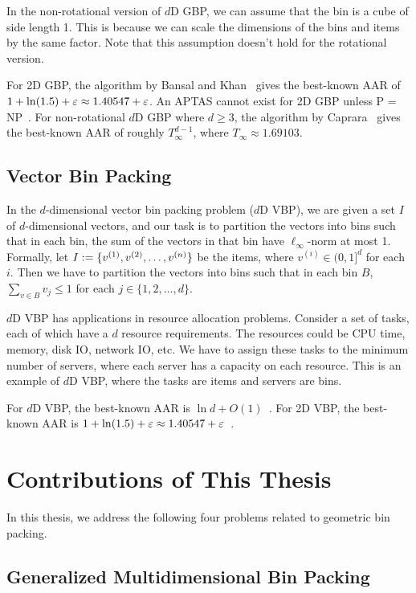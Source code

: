 In the non-rotational version of $d$D GBP, we can assume \wLoG{} that
the bin is a cube of side length 1.
This is because we can scale the dimensions of the bins and items by the same factor.
Note that this assumption doesn't hold for the rotational version.

For 2D GBP, the algorithm by Bansal and Khan~\cite{bansal2014binpacking}
gives the best-known AAR of $1 + \ln(1.5) + \varepsilon \approx 1.40547 + \varepsilon$.
An APTAS cannot exist for 2D GBP unless P = NP~\cite{bansal2006bin,chlebik2009hardness}.
For non-rotational $d$D GBP where $d \ge 3$, the algorithm by Caprara~\cite{caprara2008}
gives the best-known AAR of roughly $T_{\infty}^{d-1}$, where $T_{\infty} \approx 1.69103$.

\subsection{Vector Bin Packing}

In the $d$-dimensional vector bin packing problem ($d$D VBP),
we are given a set $I$ of $d$-dimensional vectors,
and our task is to partition the vectors into bins such that in each bin,
the sum of the vectors in that bin have $\ell_\infty$-norm at most 1.
Formally, let $I := \{v^{(1)}, v^{(2)}, \ldots, v^{(n)}\}$ be the items,
where $v^{(i)} \in (0, 1]^d$ for each $i$.
Then we have to partition the vectors into bins such that in each bin $B$,
$\sum_{v \in B} v_j \le 1$ for each $j \in \{1, 2, \ldots, d\}$.

$d$D VBP has applications in resource allocation problems.
Consider a set of tasks, each of which have a $d$ resource requirements.
The resources could be CPU time, memory, disk IO, network IO, etc.
We have to assign these tasks to the minimum number of servers,
where each server has a capacity on each resource.
This is an example of $d$D VBP, where the tasks are items and servers are bins.

For $d$D VBP, the best-known AAR is $\ln d + O(1)$~\cite{rna,bansal2016improved}.
For 2D VBP, the best-known AAR is
$1 + \ln(1.5) + \varepsilon \approx 1.40547 + \varepsilon$~\cite{bansal2016improved}.

\section{Contributions of This Thesis}

In this thesis, we address the following four problems related to geometric bin packing.

\subsection{Generalized Multidimensional Bin Packing}

